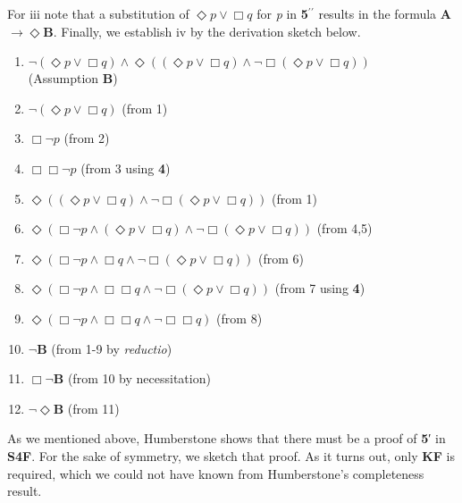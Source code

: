 \documentclass[
  10pt,
  letterpaper,
  DIV=11,
  numbers=noendperiod,
  twoside]{scrartcl}
\providecommand{\tightlist}{%
  \setlength{\itemsep}{0pt}\setlength{\parskip}{0pt}}\usepackage{longtable,booktabs,array}
\begin{document}
For iii note that a substitution of \(\Diamond{p}\vee \Box q\) for
\emph{p} in \textbf{5}\(^{\prime\prime}\) results in the formula
\textbf{A}\(\rightarrow \Diamond\textbf{B}\). Finally, we establish iv
by the derivation sketch below.

\begin{enumerate}
\def\labelenumi{\arabic{enumi}.}
\tightlist
\item
  \(\neg (\Diamond{p}\vee \Box q) \wedge \Diamond((\Diamond{p}\vee \Box q) \wedge \neg \Box (\Diamond{p}\vee \Box q))\)\\
  (Assumption \textbf{B})
\item
  \(\neg (\Diamond{p}\vee \Box q)\) (from 1)
\item
  \(\Box \neg p\) (from 2)
\item
  \(\Box \Box \neg p\) (from 3 using \textbf{4})
\item
  \(\Diamond((\Diamond{p}\vee \Box q) \wedge \neg \Box (\Diamond{p}\vee \Box q))\)
  (from 1)
\item
  \(\Diamond(\Box \neg p \wedge (\Diamond{p}\vee \Box q) \wedge \neg \Box (\Diamond{p}\vee \Box q))\)
  (from 4,5)
\item
  \(\Diamond(\Box \neg p \wedge \Box q \wedge \neg \Box (\Diamond{p}\vee \Box q))\)
  (from 6)
\item
  \(\Diamond(\Box \neg p \wedge \Box \Box q \wedge \neg \Box (\Diamond{p}\vee \Box q))\)
  (from 7 using \textbf{4})
\item
  \(\Diamond(\Box \neg p \wedge \Box \Box q \wedge \neg \Box \Box q)\)
  (from 8)
\item
  \(\neg\)\textbf{B} (from 1-9 by \emph{reductio})
\item
  \(\Box \neg\)\textbf{B} (from 10 by necessitation)
\item
  \(\neg \Diamond\)\textbf{B} (from 11)
\end{enumerate}

As we mentioned above, Humberstone shows that there must be a proof of
\textbf{5}′ in \textbf{S4F}. For the sake of symmetry, we sketch that
proof. As it turns out, only \textbf{KF} is required, which we could not
have known from Humberstone's completeness result.
\end{document}
